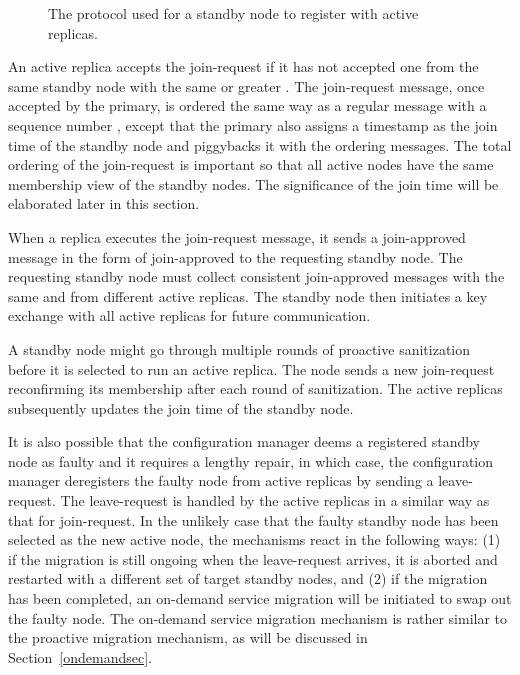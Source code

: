 \documentclass[times, 10pt, twocolumn]{article}
\begin{document}
\begin{figure}[t]
\begin{center} 
\leavevmode
\epsfxsize=3.0in
\caption{The protocol used for a standby node to register with active
replicas.}
\label{joinfig}
\end{center}
\end{figure}

An active replica accepts the {\sc join-request} if it has not
accepted one from the same standby node with the same or greater .
The {\sc join-request} message, once accepted by the primary, is ordered the 
same way as a regular message with a sequence number , except that
the primary also assigns a timestamp as the join time of the standby node
and piggybacks it with the ordering messages.
The total ordering of the {\sc join-request} is important so that all
active nodes have the same membership view of the standby nodes.
The significance of the join time will be elaborated later in this section.

When a replica executes the {\sc join-request} message, it sends a 
{\sc join-approved} message in the form of 
{\sc join-approved} to the
requesting standby node. The requesting standby node must collect
 consistent {\sc join-approved} messages with the same  and 
from different active replicas. The standby node then initiates a key
exchange with all active replicas for future communication.

A standby node might go through multiple rounds of proactive sanitization
before it is selected to run an active replica. The node sends a 
new {\sc join-request} reconfirming its membership after each round of
sanitization. The active replicas subsequently updates the join time
of the standby node.

It is also possible that the configuration manager deems a registered
standby node as faulty and it requires a lengthy repair, in which case,
the configuration manager deregisters the faulty node from active
replicas by sending a {\sc leave-request}. The {\sc leave-request} 
is handled by the active replicas in a similar way as that for
{\sc join-request}. In the unlikely case that the faulty standby node has 
been selected as the new active node, the mechanisms react in the following
ways: (1) if the migration is still ongoing when the {\sc leave-request} 
arrives, it is aborted and restarted with a different set of target standby 
nodes, and (2) if the migration has been completed, an on-demand
service migration will be initiated to swap out the faulty node. 
The on-demand service migration mechanism is rather similar to the proactive 
migration mechanism, as will be discussed in Section~\ref{ondemandsec}.
\end{document}
